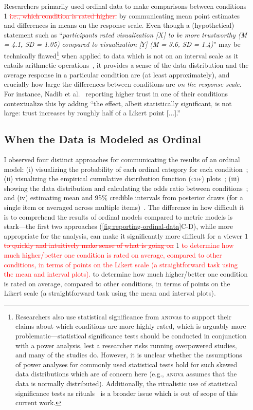\documentclass{vgtc}                          %
\def\trackchanges{0}
\newcommand{\new}[1]{%
\if\trackchanges1%
\textcolor{red}{#1}%
\else#1\fi}
\newcommand{\stout}[1]{\if\trackchanges1 \textcolor{red}{\sout{#1}} \fi}
\begin{document}
Researchers primarily used ordinal data to make comparisons between conditions%
\stout{i.e., which condition is rated higher.}
by communicating mean point estimates and differences in means on the response scale. Even though a (hypothetical) statement such as ``\textit{participants rated visualization [$X$] to be more trustworthy (M = 4.1, SD = 1.05) compared to visualization [$Y$] (M = 3.6, SD = 1.4)}'' may be technically flawed\footnote{Researchers also use statistical significance from \textsc{anova}s to support their claims about which conditions are more highly rated, which is arguably more problematic---statistical significance tests should be conducted in conjunction with a power analysis, lest a researcher risks running overpowered studies, and many of the studies do. However, it is unclear whether the assumptions of power analyses for commonly used statistical tests hold for such skewed data distributions which are of concern here (e.g., \textsc{anova} assumes that the data is normally distributed). Additionally, the ritualistic use of statistical significance tests as rituals~\cite{gigerenzer_mindless_2004, gigerenzer_statistical_2018} is a broader issue which is out of scope of this current work.}
when applied to data which is not on an interval scale as it entails arithmetic operations~\cite{victorsyiem_better_2026}, it provides a sense of the data distribution and the average response in a particular condition are (at least approximately), and crucially how large the differences between conditions are \textit{on the response scale}. For instance, Nadib et al.~\cite{nadib_guardrail_2026} reporting higher trust in one of their conditions contextualize this by adding ``the effect, albeit statistically significant, is not large: trust increases by roughly half of a Likert point [...].''

\subsection{When the Data is Modeled as Ordinal}
I observed four distinct approaches for communicating the results of an ordinal model: (i) visualizing the probability of each ordinal category for each condition~\cite{sarma_evaluating_2023, saske_multidimensional_2026, helske_can_2021}; (ii) visualizing the empirical cumulative distribution function (\textsc{cdf}) plots~\cite{rogha_impact_2024}; (iii) showing the data distribution and calculating the odds ratio between conditions~\cite{bradley_magnitude_2025}; and (iv) estimating mean and 95\% credible intervals from posterior draws (for a single item or averaged across multiple items)~\cite{yang_swaying_2024, dragicevic_increasing_2019}. The difference in how difficult it is to comprehend the results of ordinal models compared to metric models is stark---the first two approaches (\autoref{fig:reporting-ordinal-data}C-D), while more appropriate for the analysis, can make it significantly more difficult for a viewer%
\stout{to quickly and intuitively make sense of what is going on} 
\new{to determine how much higher/better one condition is rated on average, compared to other conditions, in terms of points on the Likert scale (a straightforward task using the mean and interval plots).}
\end{document}

